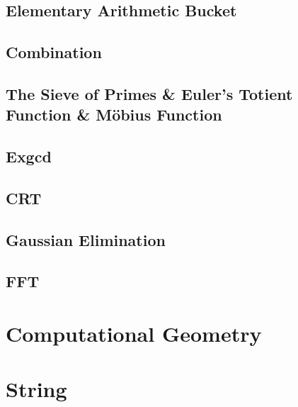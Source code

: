 \documentclass[a4paper]{article}
\begin{document}
\subsection{Elementary Arithmetic Bucket}



\subsection{Combination}



\subsection{The Sieve of Primes \& Euler's Totient Function \& Möbius Function}



\subsection{Exgcd}



\subsection{CRT}



\subsection{Gaussian Elimination}



\subsection{FFT}

\section{Computational Geometry}



\pagebreak

\section{String}
\end{document}
